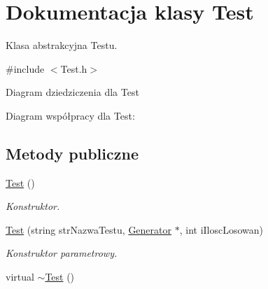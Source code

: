 \hypertarget{classTest}{\section{Dokumentacja klasy Test}
\label{classTest}
}


Klasa abstrakcyjna Testu.  




{\ttfamily \#include $<$Test.\+h$>$}



Diagram dziedziczenia dla Test


Diagram współpracy dla Test\+:
\subsection*{Metody publiczne}
\begin{DoxyCompactItemize}
\item 
\hypertarget{classTest_a99f2bbfac6c95612322b0f10e607ebe5}{\hyperlink{classTest_a99f2bbfac6c95612322b0f10e607ebe5}{Test} ()}\label{classTest_a99f2bbfac6c95612322b0f10e607ebe5}

\begin{DoxyCompactList}\small\item\em Konstruktor. \end{DoxyCompactList}\item 
\hyperlink{classTest_a14b20306f1446ab9c1b9310529a5406b}{Test} (string str\+Nazwa\+Testu, \hyperlink{classGenerator}{Generator} $\ast$, int i\+Ilosc\+Losowan)
\begin{DoxyCompactList}\small\item\em Konstruktor parametrowy. \end{DoxyCompactList}\item 
\hypertarget{classTest_a2b0a62f1e667bbe8d8cb18d785bfa991}{virtual \hyperlink{classTest_a2b0a62f1e667bbe8d8cb18d785bfa991}{$\sim$\+Test} ()}\label{classTest_a2b0a62f1e667bbe8d8cb18d785bfa991}


\end{DoxyCompactItemize}
